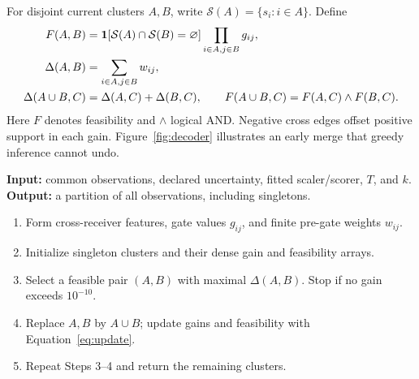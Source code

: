 For disjoint current clusters $A,B$, write $\mathcal S(A)=\{s_i:i\in A\}$. Define
\begin{align}
 F(A,B)&=\mathbf{1}[\mathcal S(A)\cap\mathcal S(B)=\varnothing]
              \prod_{i\in A,j\in B}g_{ij},\label{eq:feasible}\\
 \Delta(A,B)&=\sum_{i\in A,j\in B}w_{ij},\label{eq:gain}\\
 \Delta(A\cup B,C)&=\Delta(A,C)+\Delta(B,C),\qquad
 F(A\cup B,C)=F(A,C)\wedge F(B,C).\label{eq:update}
\end{align}
Here $F$ denotes feasibility and $\wedge$ logical AND. Negative cross edges offset positive support in each gain. Figure~\ref{fig:decoder} illustrates an early merge that greedy inference cannot undo.


\begin{psalgorithm}[!t]\caption{Receiver-exclusive, all-pairs-admissible greedy association}\label{alg:greedy}
\begin{minipage}{\linewidth}\small
\textbf{Input:} common observations, declared uncertainty, fitted scaler/scorer, $T$, and $k$.\\
\textbf{Output:} a partition of all observations, including singletons.
\begin{enumerate}[label=\arabic*.,leftmargin=1.6em,itemsep=2pt]
\item Form cross-receiver features, gate values $g_{ij}$, and finite pre-gate weights $w_{ij}$.
\item Initialize singleton clusters and their dense gain and feasibility arrays.
\item Select a feasible pair $(A,B)$ with maximal $\Delta(A,B)$. Stop if no gain exceeds $10^{-10}$.
\item Replace $A,B$ by $A\cup B$; update gains and feasibility with Equation~\eqref{eq:update}.
\item Repeat Steps 3--4 and return the remaining clusters.
\end{enumerate}\end{minipage}
\end{psalgorithm}

